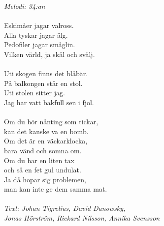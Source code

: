 {\footnotesize\textit{Melodi: 34:an}}\\
\\
Eskimåer jagar valross.\\
Alla tyskar jagar älg.\\
Pedofiler jagar småglin.\\
Vilken värld, ja skål och svälj.\\
\\
Uti skogen finns det blåbär.\\
På balkongen står en stol.\\
Uti stolen sitter jag.\\
Jag har vatt bakfull sen i fjol.\\
\\
Om du hör nånting som tickar,\\
kan det kanske va en bomb.\\
Om det är en väckarklocka,\\
bara vänd och somna om.\\
Om du har en liten tax\\
och så en fet gul undulat.\\
\revrpt Ja då hopar sig problemen,\\
man kan inte ge dem samma mat.\rpt\\
\\
{\footnotesize\textit{Text: Johan Tigrelius, David Danowsky,\\ Jonas Hörström, Rickard Nilsson, Annika Svensson}}
